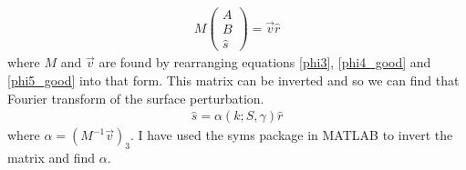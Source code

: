 \documentclass[12pt]{article}
\begin{document}
\begin{align}
M\begin{pmatrix}
A \\ B \\ \hat{s}
\end{pmatrix}= \vec{v}\hat{r}
\end{align}
where $M$ and $\vec{v}$ are found by rearranging equations \eqref{phi3}, \eqref{phi4_good} and \eqref{phi5_good} into that form. This matrix can be inverted and so we can find that Fourier transform of the surface perturbation.
\begin{align}
\hat{s} = \alpha(k;S,\gamma)\hat{r}
\end{align}
 where $\alpha = (M^{-1}\vec{v})_3$. I have used the syms package in MATLAB to invert the matrix and find $\alpha$.
%
%
\end{document}
